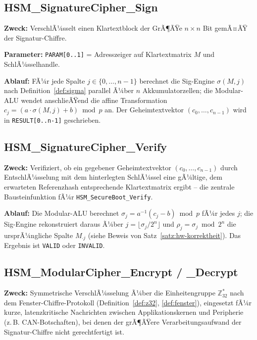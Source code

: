 ﻿\documentclass[a4paper,12pt]{article}
\theoremstyle{definition}
\begin{document}
\subsection{HSM\_SignatureCipher\_Sign}
\label{sec:funk-sign}

\textbf{Zweck:} VerschlÃ¼sselt einen Klartextblock der GrÃ¶ÃŸe $n \times n$ Bit gemÃ¤ÃŸ der Signatur-Chiffre.

\textbf{Parameter:} \texttt{PARAM[0..1]} = Adresszeiger auf Klartextmatrix $M$ und SchlÃ¼sselhandle.

\textbf{Ablauf:} FÃ¼r jede Spalte $j \in \{0,\ldots,n-1\}$ berechnet die Sig-Engine $\sigma(M,j)$ nach Definition~\ref{def:sigma} parallel Ã¼ber $n$ Akkumulatorzellen; die Modular-ALU wendet anschlieÃŸend die affine Transformation $c_j = (a \cdot \sigma(M,j) + b) \bmod p$ an. Der Geheimtextvektor $(c_0,\ldots,c_{n-1})$ wird in \texttt{RESULT[0..n-1]} geschrieben.

\subsection{HSM\_SignatureCipher\_Verify}

\textbf{Zweck:} Verifiziert, ob ein gegebener Geheimtextvektor $(c_0,\ldots,c_{n-1})$ durch EntschlÃ¼sselung mit dem hinterlegten SchlÃ¼ssel eine gÃ¼ltige, dem erwarteten Referenzhash entsprechende Klartextmatrix ergibt -- die zentrale Bausteinfunktion fÃ¼r \texttt{HSM\_SecureBoot\_Verify}.

\textbf{Ablauf:} Die Modular-ALU berechnet $\sigma_j = a^{-1}(c_j - b) \bmod p$ fÃ¼r jedes $j$; die Sig-Engine rekonstruiert daraus Ã¼ber $j = \lfloor \sigma_j / 2^n \rfloor$ und $\rho_j = \sigma_j \bmod 2^n$ die ursprÃ¼ngliche Spalte $M_{\cdot j}$ (siehe Beweis von Satz~\ref{satz:hw-korrektheit}). Das Ergebnis ist \texttt{VALID} oder \texttt{INVALID}.

\subsection{HSM\_ModularCipher\_Encrypt / \_Decrypt}

\textbf{Zweck:} Symmetrische VerschlÃ¼sselung Ã¼ber die Einheitengruppe $\mathbb{Z}_{32}^*$ nach dem Fenster-Chiffre-Protokoll (Definition~\ref{def:z32}, \ref{def:fenster}), eingesetzt fÃ¼r kurze, latenzkritische Nachrichten zwischen Applikationskernen und Peripherie (z.\,B. CAN-Botschaften), bei denen der grÃ¶ÃŸere Verarbeitungsaufwand der Signatur-Chiffre nicht gerechtfertigt ist.
\end{document}

